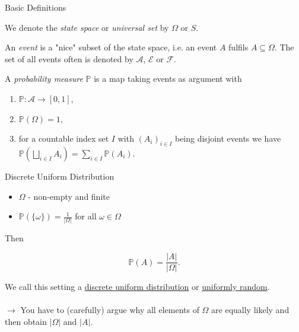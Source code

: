 \documentclass[11pt,pdf,ngerman,UKenglish]{beamer}%
\newcommand{\IP}{\mathbb{P}}
\newcommand{\1}{\mathbb{1}}
\theoremstyle{thm}
\theoremstyle{def}
\begin{document}
\begin{frame}{Basic Definitions}
\begin{definition}
We denote the \emph{state space} or \emph{universal set} by $\Omega$ or $S$. 
\end{definition}
\pause
\begin{definition}[Event]
An \emph{event} is a "nice" subset of the state space, i.e. an event $A$ fulfils $A \subseteq \Omega$.
The set of all events often is denoted by $\mathcal{A}$, $\mathcal{E}$ or $\mathcal{F}$.
\end{definition}
\pause
\begin{definition}
A \emph{probability measure} $\IP$ is a map taking events as argument with
\begin{enumerate}
\item $\IP: \mathcal{A} \to [0,1]$,
\item $\IP(\Omega)=1$,
\item for a countable index set $I$ with $(A_i)_{i \in I}$ being disjoint events we have $\IP( \bigsqcup_{i \in I} A_i) = \sum_{i\in I} \IP(A_i)$.
\end{enumerate}
\end{definition}
\end{frame}

\begin{frame}{Discrete Uniform Distribution}
\begin{itemize}
\item $\Omega$ - non-empty and finite
\item $\IP(\{\omega\})= \frac{1}{\vert \Omega \vert }$ for all $\omega \in \Omega$
\end{itemize}
Then
\begin{block}{}
$$ \IP(A) = \frac{ \vert A \vert }{ \vert \Omega \vert }. $$
\end{block}
We call this setting a \underline{discrete uniform distribution} or \underline{uniformly random}.
\pause
\\ \ \\
$\to$ You have to (carefully) argue why all elements of $\Omega$ are equally likely and then obtain $\vert \Omega \vert$ and $\vert A \vert$.
\end{frame}
\end{document}

